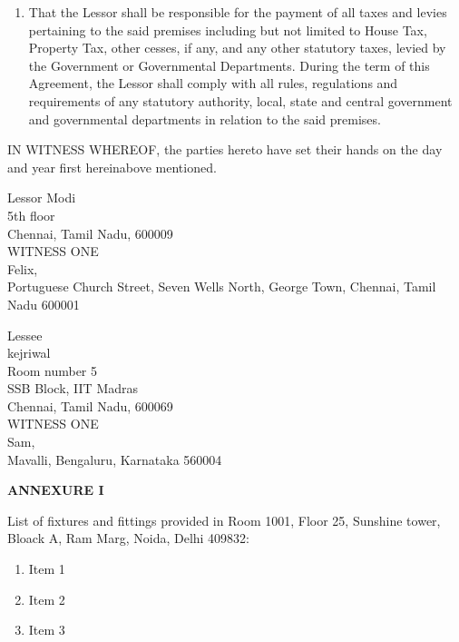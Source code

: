 \documentclass[legalpaper,12pt]{article}
\begin{document}
\begin{enumerate}
    \item That the Lessor shall be responsible for the payment of all taxes and levies pertaining to the said premises including but not limited to House Tax, Property Tax, other cesses, if any, and any other statutory taxes, levied by the Government or Governmental Departments. During the term of this Agreement, the Lessor shall comply with all rules, regulations and requirements of any statutory authority, local, state and central government and governmental departments in relation to the said premises.

\end{enumerate}
\pagebreak 
\begin{minipage}{\textwidth}
IN WITNESS WHEREOF, the parties hereto have set their hands on the day and year first
hereinabove mentioned.
\vspace{1cm}
\end{minipage}

\begin{minipage}{0.6\textwidth}
\raggedright{
    Lessor\newline
	Modi\\
	5th floor
	\\
	Chennai, Tamil Nadu, 600009\\
    \vspace{2cm}
    WITNESS ONE\\
    \vspace{1cm}
	Felix, \\ Portuguese Church Street, Seven Wells North, George Town, Chennai, Tamil Nadu 600001
    }
\end{minipage}
\hfill
\begin{minipage}{0.5\textwidth}
\raggedright{
    Lessee\\
	kejriwal\\
    	Room number 5\\
	SSB Block, IIT Madras\\
	Chennai, Tamil Nadu, 600069\\
    \vspace{2cm}
    WITNESS ONE\\
    \vspace{1cm}
	Sam, \\ Mavalli, Bengaluru, Karnataka 560004}
\end{minipage}

 \pagebreak
\centerline{\textbf{\Large{ANNEXURE I}}}
List of fixtures and fittings provided in Room 1001, Floor 25, Sunshine tower, Bloack A, Ram Marg, Noida, Delhi 409832:

\begin{enumerate}
    \item Item 1
    \item Item 2
    \item Item 3
\end{enumerate}
\restoregeometry
\end{document}
